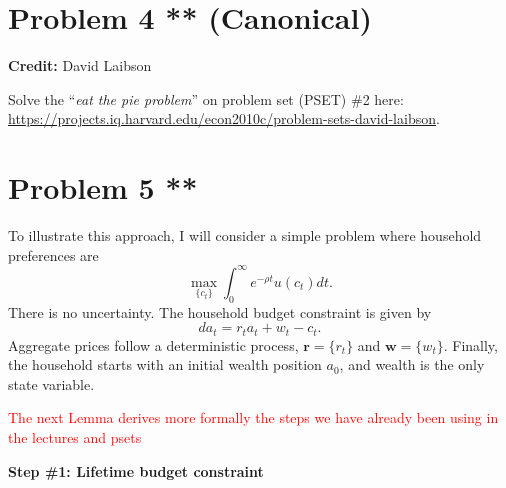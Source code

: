 \documentclass[11pt]{extarticle}
\theoremstyle{plain}
\theoremstyle{definition}
\begin{document}
\vspace{10mm}
\section*{Problem 4 ** (Canonical)}

\textbf{Credit:} David Laibson

\vspace{5mm}
\noindent
Solve the ``\textit{eat the pie problem}'' on problem set (PSET) \#2 here: \url{https://projects.iq.harvard.edu/econ2010c/problem-sets-david-laibson}.





\vspace{10mm}
\section*{Problem 5 **}


To illustrate this approach, I will consider a simple problem where household preferences are 
\begin{equation*}
	\max_{\{c_t\}} \int_0^\infty e^{- \rho t} u(c_t) dt. 
\end{equation*}
There is no uncertainty. The household budget constraint is given by
\begin{equation*}
	da_t = r_t a_t + w_t - c_t. 
\end{equation*}
Aggregate prices follow a deterministic process, $\bm{r} = \{r_t\}$ and $\bm{w} = \{w_t\}$. Finally, the household starts with an initial wealth position $a_0$, and wealth is the only state variable. 



\textcolor{red}{The next Lemma derives more formally the steps we have already been using in the lectures and psets}

\vspace{5mm}
\noindent
\textbf{Step \#1: Lifetime budget constraint}
\end{document}
